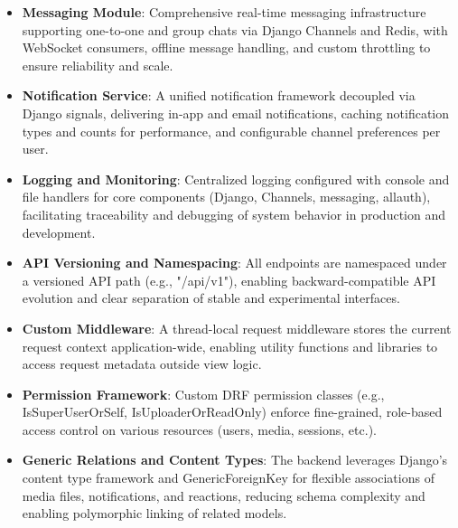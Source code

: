 \begin{itemize}
  \item \textbf{Messaging Module}: Comprehensive real-time messaging infrastructure supporting one-to-one and group chats via Django Channels and Redis, with WebSocket consumers, offline message handling, and custom throttling to ensure reliability and scale.

  \item \textbf{Notification Service}: A unified notification framework decoupled via Django signals, delivering in-app and email notifications, caching notification types and counts for performance, and configurable channel preferences per user.

  \item \textbf{Logging and Monitoring}: Centralized logging configured with console and file handlers for core components (Django, Channels, messaging, allauth), facilitating traceability and debugging of system behavior in production and development.

  \item \textbf{API Versioning and Namespacing}: All endpoints are namespaced under a versioned API path (e.g., "/api/v1"), enabling backward-compatible API evolution and clear separation of stable and experimental interfaces.

  \item \textbf{Custom Middleware}: A thread-local request middleware stores the current request context application-wide, enabling utility functions and libraries to access request metadata outside view logic.

  \item \textbf{Permission Framework}: Custom DRF permission classes (e.g., IsSuperUserOrSelf, IsUploaderOrReadOnly) enforce fine-grained, role-based access control on various resources (users, media, sessions, etc.).

  \item \textbf{Generic Relations and Content Types}: The backend leverages Django's content type framework and GenericForeignKey for flexible associations of media files, notifications, and reactions, reducing schema complexity and enabling polymorphic linking of related models.


\end{itemize}
